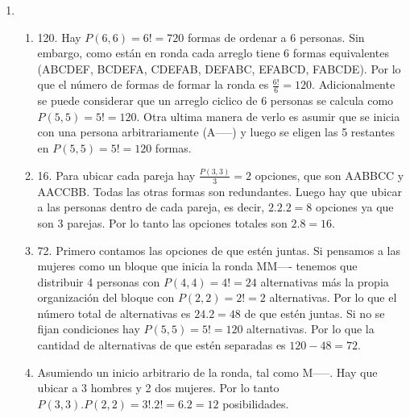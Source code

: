 \documentclass[a4paper]{article}
\newcommand{\exercise}{\item}
\begin{document}
\begin{enumerate}
\begin{enumerate} [label=(\alph*)]
		\item Posición 8. Contamos las opciones de que el número sea mayor o igual. Una opción es que sea $87---$ que tiene $P(3,3)=3!=6$ opciones. Otra opción es que sea $837--$ con $P(2,2)=2!=2$ opciones (esta opción incluye al 83712). El número total de opciones, que es igual a la posición del número, será $6+2=8$.
		\item 8400. En la última cifra hay 5 opciones (1,3,5,7,9). Luego, queda definir las 4 cifras restantes con los 8 digitos que quedan, es decir, $P(8,4)=\frac{8!}{4!}=8.7.6.5=1680$ opciones. El total de opciones será $5.1680=8400$
		\item 2520. Primero definimos las dos primeras cifras a partir de los 4 dígitos pares (2,4,6,8), es decir, $4.3=12$ opciones. Luego definimos las 3 cifras restantes con los 7 digitos que quedan, es decir, $P(7,3)=\frac{7!}{4!}=7.6.5=210$ opciones. El total de opciones será $12.210=2520$.
		\item 264. Para que la suma de las cifras de par hay varias opciones: todas ellas deben ser pares (con $4.3.2=24$ opciones), sólo la primera cifra debe ser par (con $4.5.4=80$ opciones), sólo la segunda debe ser par (con $5.4.4=80$ opciones), o sólo la última debe ser par (con $5.4.4=80$ opciones). El total de opciones es $24+80+80+80=264$.
\item ---\item ---\end{enumerate}\exercise\begin{enumerate} [label=(\alph*)]		\item 120. Hay $P(6,6)=6!=720$ formas de ordenar a 6 personas. Sin embargo, como están en ronda cada arreglo tiene 6 formas equivalentes (ABCDEF, BCDEFA, CDEFAB, DEFABC, EFABCD, FABCDE). Por lo que el número de formas de formar la ronda es $\frac{6!}{6}=120$. Adicionalmente se puede considerar que un arreglo ciclico de 6 personas se calcula como $P(5,5)=5!=120$. Otra ultima manera de verlo es asumir que se inicia con una persona arbitrariamente (A-----) y luego se eligen las 5 restantes en $P(5,5)=5!=120$ formas.
		\item 16. Para ubicar cada pareja hay $\frac{P(3,3)}{3}=2$ opciones, que son AABBCC y AACCBB. Todas las otras formas son redundantes. Luego hay que ubicar a las personas dentro de cada pareja, es decir, $2.2.2=8$ opciones ya que son 3 parejas. Por lo tanto las opciones totales son $2.8=16$.
		\item 72. Primero contamos las opciones de que estén juntas. Si pensamos a las mujeres como un bloque que inicia la ronda MM---- tenemos que distribuir 4 personas con $P(4,4)=4!=24$ alternativas más la propia organización del bloque con $P(2,2)=2!=2$ alternativas. Por lo que el número total de alternativas es $24.2=48$ de que estén juntas. Si no se fijan condiciones hay $P(5,5)=5!=120$ alternativas. Por lo que la cantidad de alternativas de que estén separadas es $120-48=72$.
		\item Asumiendo un inicio arbitrario de la ronda, tal como M-----. Hay que ubicar a 3 hombres y 2 dos mujeres. Por lo tanto $P(3,3).P(2,2)=3!.2!=6.2=12$ posibilidades.
\end{enumerate}\end{enumerate}
\end{document}

